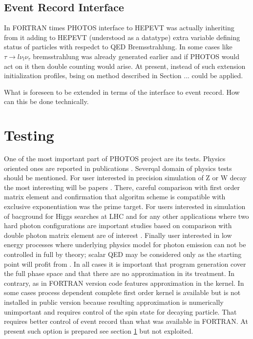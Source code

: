 \documentclass[]{Photos_interface_design}
\begin{document}
 
\subsection{Event Record Interface}
In FORTRAN times PHOTOS interface to HEPEVT was actually inheriting from it
adding to HEPEVT (understood as a datatype) extra variable defining 
status of particles with respedct to QED Bremsstrahlung. In some cases like
$\tau \to l \nu_l \nu_\tau$ bremsstrahlung was already generated earlier
and if PHOTOS would act on it then double counting would arise.
At present, instead of such extension initialization profiles, bsing on method described in Section ... could be applied.


What is foreseen to be extended in terms of the interface to event record. How can this be done technically.

\section{Testing}

One of the most important part of PHOTOS project are its tests.
Physics oriented ones are reported in publications \cite{}. Severqal domain
of physics tests should be mentioned. For user interested in precision 
simulation of Z or W decay the most interesting will be papers \cite{Nanava:2009vg,Golonka:2006tw}. There, careful comparison with first order matrix element 
and confirmation that algoritm scheme  is compatible with exclusive 
exponentiation was the prime target. For users interested in simulation of
bacground for Higgs searches at LHC and for any other applications where 
two hard photon configurations are important studies based on comparison with 
double photon matrix element are of 
interest \cite{Barberio:1993qi,RichterWas:1994ep,RichterWas:1993ta}.
Finally user interested in low energy processes where underlying physics model 
for photon emission can not be controlled in full by theory; scalar QED may 
be considered only as the starting point will profit 
from \cite{Nanava:2009vg,Nanava:2006vv}. In all cases it is important that
 program generation cover the full phase space and that there are no 
approximation in its treatment. In contrary, as in FORTRAN version code 
features approximation in the kernel. In some cases process dependent 
complete first order 
kernel is available but is not installed in public version  
because resulting approximation is 
numerically unimportant and requires control of the spin state for decaying 
particle. That requires better control of event record than what was available 
in FORTRAN. At present such option is prepared see section \ref{} but not exploited. 
\end{document}

